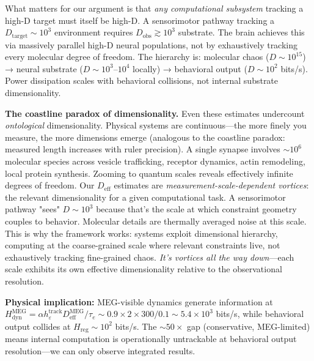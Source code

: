 \documentclass[12pt]{article}
\begin{document}
What matters for our argument is that \textit{any computational subsystem} tracking a high-D target must itself be high-D. A sensorimotor pathway tracking a $D_{\text{target}} \sim 10^3$ environment requires $D_{\text{obs}} \gtrsim 10^3$ substrate. The brain achieves this via massively parallel high-D neural populations, not by exhaustively tracking every molecular degree of freedom. The hierarchy is: molecular chaos ($D \sim 10^{15}$) → neural substrate ($D \sim 10^3$--$10^4$ locally) → behavioral output ($D \sim 10^2$ bits/s). Power dissipation scales with behavioral collisions, not internal substrate dimensionality.

\textbf{The coastline paradox of dimensionality.} Even these estimates undercount \textit{ontological} dimensionality. Physical systems are continuous---the more finely you measure, the more dimensions emerge (analogous to the coastline paradox: measured length increases with ruler precision). A single synapse involves $\sim 10^6$ molecular species across vesicle trafficking, receptor dynamics, actin remodeling, local protein synthesis. Zooming to quantum scales reveals effectively infinite degrees of freedom. Our $D_{\text{eff}}$ estimates are \textit{measurement-scale-dependent vortices}: the relevant dimensionality for a given computational task. A sensorimotor pathway "sees" $D \sim 10^3$ because that's the scale at which constraint geometry couples to behavior. Molecular details are thermally averaged noise at this scale. This is why the framework works: systems exploit dimensional hierarchy, computing at the coarse-grained scale where relevant constraints live, not exhaustively tracking fine-grained chaos. \textit{It's vortices all the way down}---each scale exhibits its own effective dimensionality relative to the observational resolution.

\textbf{Physical implication:} MEG-visible dynamics generate information at $H_{\text{dyn}}^{\text{MEG}} = \alpha h_\varepsilon^{\text{track}} D_{\text{eff}}^{\text{MEG}}/\tau_e \sim 0.9 \times 2 \times 300 / 0.1 \sim 5.4 \times 10^3$ bits/s, while behavioral output collides at $H_{\text{reg}} \sim 10^2$ bits/s. The $\sim 50\times$ gap (conservative, MEG-limited) means internal computation is operationally untrackable at behavioral output resolution—we can only observe integrated results.
\end{document}
